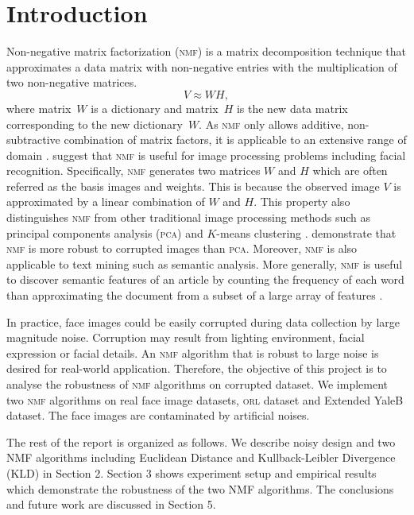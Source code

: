 \section{Introduction\label{chapter1}}
Non-negative matrix factorization (\textsc{nmf}) is a matrix decomposition technique that approximates a data matrix with non-negative entries with the multiplication of two non-negative matrices.
\begin{equation*}
  V \approx WH,
\end{equation*}
where matrix~$W$ is a dictionary and matrix~$H$ is the new data matrix corresponding to the new dictionary~$W$. As \textsc{nmf} only allows additive, non-subtractive combination of matrix factors, it is applicable to an extensive range of domain . \citet{lee1999learning} suggest that \textsc{nmf} is useful for image processing problems including facial recognition. Specifically, \textsc{nmf} generates two matrices $W$ and $H$ which are often referred as the basis images and weights. This is because the observed image $V$ is approximated by a linear combination of $W$ and $H$. This property also distinguishes \textsc{nmf} from other traditional image processing methods such as principal components analysis (\textsc{pca}) and $K$-means clustering . \citet{guillamet2002non} demonstrate that \textsc{nmf} is more robust to corrupted images than \textsc{pca}.
Moreover, \textsc{nmf} is also applicable to text mining such as semantic analysis. More generally, \textsc{nmf} is useful to discover semantic features of an article by counting the frequency of each word than approximating the document from a subset of a large array of features \citep{lee1999learning}.

In practice, face images could be easily corrupted during data collection by large magnitude noise. Corruption may result from lighting environment, facial expression or facial details. An \textsc{nmf} algorithm that is robust to large noise is desired for real-world application. Therefore, the objective of this project is to analyse the robustness of \textsc{nmf} algorithms on corrupted dataset. We implement two \textsc{nmf} algorithms on real face image datasets, \textsc{orl} dataset and Extended YaleB dataset. The face images are contaminated by artificial noises.

The rest of the report is organized as follows. We describe noisy design and two \textsc{NMF} algorithms including Euclidean Distance and Kullback-Leibler Divergence (\textsc{KLD}) in Section 2. Section 3 shows experiment setup and empirical results which demonstrate the robustness of the two NMF algorithms. The conclusions and future work are discussed in Section 5.
